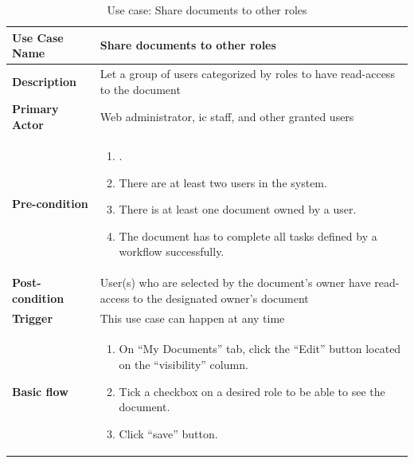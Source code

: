 \begin{table}
	\centering
	\caption{Use case: Share documents to other roles}
	\begin{tabular}{|l|L{9cm}|}
		\hline
		\textbf{Use Case Name} & Share documents to other roles \\
		\hline
		
		\textbf{Description} & Let a group of users categorized by roles to have read-access to the document \\
		\textbf{Primary Actor} & Web administrator, \gls{ic} staff, and other granted users \\
		\textbf{Pre-condition} & 
		\begin{enumerate}
			\item \alreadylogin.
			\item There are at least two users in the system.
			\item There is at least one document owned by a user.
			\item The document has to complete all tasks defined by a workflow successfully.
		\end{enumerate} \\
		\textbf{Post-condition} & User(s) who are selected by the document's owner have read-access to the designated owner's document \\
		\textbf{Trigger} & This use case can happen at any time \\
		\textbf{Basic flow} & 
		\begin{enumerate}
			\item On \enquote{My Documents} tab, click the \enquote{Edit} button located on the \enquote{visibility} column.
			\item Tick a checkbox on a desired role to be able to see the document.
			\item Click \enquote{save} button.
		\end{enumerate} \\
		\hline
	\end{tabular}
\end{table}

